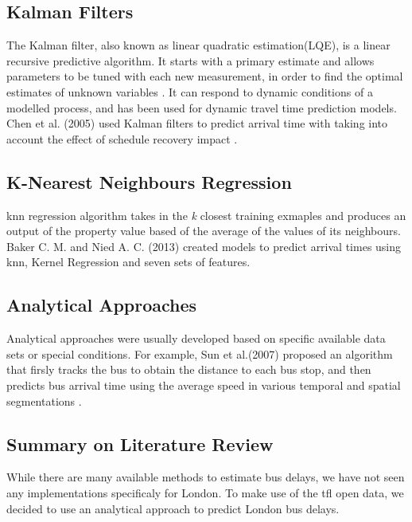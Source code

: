 \subsection{Kalman Filters}
\par The Kalman filter, also known as linear quadratic estimation(LQE), is a linear recursive predictive algorithm. It starts with a primary estimate and allows parameters to be tuned with each new measurement, in order to find the optimal estimates of unknown variables \cite{kalman_filters}. It can respond to dynamic conditions of a modelled process, and has been used for dynamic travel time prediction models. Chen et al. (2005) used Kalman filters to predict arrival time with taking into account the effect of schedule recovery impact \cite{kalman_dynamic_schedule}.

\subsection{K-Nearest Neighbours Regression}
\par \acrfull{knn} regression algorithm takes in the \textit{k} closest training exmaples and produces an output of the property value based of the average of the values of its neighbours. Baker C. M. and Nied A. C. (2013) created models to predict arrival times using \acrshort{knn}, Kernel Regression and seven sets of features\cite{knn_one_bus_away}.

\subsection{Analytical Approaches}
\par Analytical approaches were usually developed based on specific available data sets or special conditions. For example, Sun et al.(2007) proposed an algorithm that firsly tracks the bus to obtain the distance to each bus stop, and then predicts bus arrival time using the average speed in various temporal and spatial segmentations \cite{analytical_approach}.

\subsection{Summary on Literature Review}
\par While there are many available methods to estimate bus delays, we have not seen any implementations specificaly for London. To make use of the \acrshort{tfl} open data, we decided to use an analytical approach to predict London bus delays.

